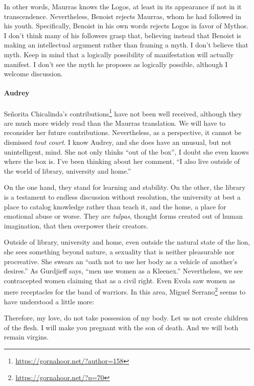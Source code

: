 In other words, Maurras knows the Logos, at least in its appearance if not in it transcendence. Nevertheless, Benoist rejects Maurras, whom he had followed in his youth. Specifically, Benoist in his own words rejects Logos in favor of Mythos. I don't think many of his followers grasp that, believing instead that Benoist is making an intellectual argument rather than framing a myth. I don't believe that myth. Keep in mind that a logically possibility of manifestation will actually manifest. I don't see the myth he proposes as logically possible, although I welcome discussion.

\paragraph{Audrey}

Señorita Chicalinda's contributions\footnote{\url{https://gornahoor.net/?author=158}} have not been well received, although they are much more widely read than the Maurras translation. We will have to reconsider her future contributions. Nevertheless, as a perspective, it cannot be dismissed \emph{tout court}. I know Audrey, and she does have an unusual, but not unintelligent, mind. She not only thinks ``out of the box'', I doubt she even knows where the box is. I've been thinking about her comment, ``I also live outside of the world of library, university and home.''

On the one hand, they stand for learning and stability. On the other, the library is a testament to endless discussion without resolution, the university at best a place to catalog knowledge rather than teach it, and the home, a place for emotional abuse or worse. They are \emph{tulpas}, thought forms created out of human imagination, that then overpower their creators.

Outside of library, university and home, even outside the natural state of the lion, she sees something beyond nature, a sexuality that is neither pleasurable nor procreative. She swears an ``oath not to use her body as a vehicle of another's desires.'' As Gurdjieff says, ``men use women as a Kleenex.'' Nevertheless, we see contracepted women claiming that as a civil right. Even Evola saw women as mere receptacles for the band of warriors. In this area, Miguel Serrano\footnote{\url{https://gornahoor.net/?p=70}} seems to have understood a little more:

\begin{quotex}
Therefore, my love, do not take possession of my body. Let us not create children of the flesh. I will make you pregnant with the son of death. And we will both remain virgins.
\end{quotex}



